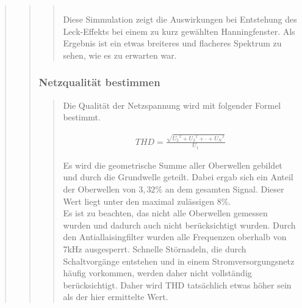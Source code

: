 \begin{quote}
\begin{quote}
\begin{quote}
\begin{center}
\begin{tabular}{ll}
                \end{tabular}
                \end{center}
                \vspace{1em}
        
        Diese Simmulation zeigt die Auswirkungen bei Entstehung des
        Leck-Effekts bei einem zu kurz gewählten Hanningfenster. Als Ergebnis ist ein
        etwas breiteres und flacheres Spektrum zu sehen, wie es zu erwarten war.
		\end{quote} %
         
        \subsubsection{Netzqualität bestimmen}
    	\begin{quote}
    		Die Qualität der Netzspannung wird mit folgender Formel bestimmt.
    		
    		\begin{align}
                THD = \frac{\sqrt{{U_2}^2+{U_3}^2+ \cdot + {U_N}^2}}{U_1}
            \end{align}
            
            Es wird die geometrische Summe aller Oberwellen gebildet und durch die Grundwelle geteilt.
            Dabei ergab sich ein Anteil der Oberwellen von $3,32\%$ an dem gesamten Signal. Dieser Wert liegt unter den
            maximal zulässigen $8\%$.\\
            Es ist zu beachten, das nicht alle Oberwellen gemessen wurden und dadurch auch nicht berücksichtigt wurden.
            Durch den Antiallaisingfilter wurden alle Frequenzen oberhalb von 7kHz ausgesperrt. Schnelle Störnadeln, die
            durch Schaltvorgänge entstehen und in einem Stromversorgungsnetz häufig vorkommen, werden daher nicht
            vollständig berücksichtigt. Daher wird THD tatsächlich etwas höher sein als der hier ermittelte Wert.
            

\end{quote}
\end{quote}
\end{quote}
